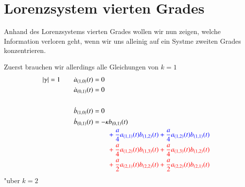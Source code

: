 \section{Lorenzsystem vierten Grades\label{section:lorenz2:4degreelorenz}}
Anhand des Lorenzsystems vierten Grades wollen wir nun zeigen, welche 
Information verloren geht, wenn wir uns alleinig auf ein Systme zweiten Grades 
konzentrieren.

Zuerst brauchen wir allerdings alle Gleichungen von $k = 1$
\begin{align*}
|\gamma| = 1
\qquad &
\dot{a}_{(1,0)}(t) = 0
\\
&
\dot{a}_{(0,1)}(t) = 0
\\
\\
&
\dot{b}_{(1,0)}(t) = 0
\\
&
\dot{b}_{(0,1)}(t)
=
-
\kappa
b_{(0,1)}(t)
\\
&\phantom{aaaaaaaaaa}
\color{blue}
+
\frac{a}{4} a_{(1,1)}(t) b_{(1,2)}(t)
+
\frac{a}{4} a_{(1,2)}(t) b_{(1,1)}(t)
\\
&\phantom{aaaaaaaaaa}
\color{red}
+
\frac{a}{4} a_{(1,2)}(t) b_{(1,3)}(t)
+
\frac{a}{4} a_{(1,3)}(t) b_{(1,2)}(t)
\\
&\phantom{aaaaaaaaaa}
\color{red}
+
\frac{a}{2} a_{(2,1)}(t) b_{(2,2)}(t)
+
\frac{a}{2} a_{(2,2)}(t) b_{(2,1)}(t)
\end{align*}
"uber $k = 2$
